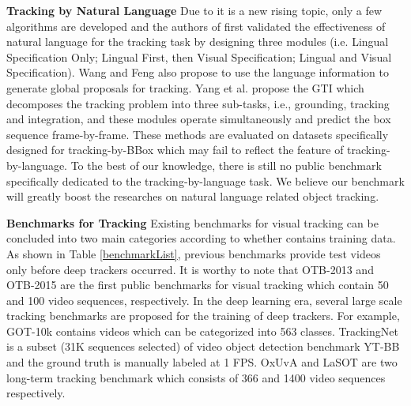 \documentclass[final]{cvpr}
\begin{document}
\textbf{Tracking by Natural Language } 
Due to it is a new rising topic, only a few algorithms are developed and the authors of \cite{li2017tracking} first validated the effectiveness of natural language for the tracking task by designing three modules (i.e. Lingual Specification Only; Lingual First, then Visual Specification; Lingual and Visual Specification). Wang \cite{wang2018describe} and Feng \cite{feng2019robust} also propose to use the language information to generate global proposals for tracking. Yang et al. propose the GTI \cite{yang2019grounding} which decomposes the tracking problem into three sub-tasks, i.e., grounding, tracking and integration, and these modules operate simultaneously and predict the box sequence frame-by-frame. These methods are evaluated on datasets specifically designed for tracking-by-BBox which may fail to reflect the feature of tracking-by-language. To the best of our knowledge, there is still no public benchmark specifically dedicated to the tracking-by-language task. We believe our benchmark will greatly boost the researches on natural language related object tracking. 



\textbf{Benchmarks for Tracking }
Existing benchmarks for visual tracking can be concluded into two main categories according to whether contains training data. As shown in Table \ref{benchmarkList}, previous benchmarks \cite{Liang2015Encoding, Wu2013Online, wu2015object, VOT_TPAMI, nus_pro, li2017visualuav, li2017visualuav, kiani2017Nfs} provide test videos only before deep trackers occurred. It is worthy to note that OTB-2013 \cite{Wu2013Online} and OTB-2015 \cite{wu2015object} are the first public benchmarks for visual tracking which contain 50 and 100 video sequences, respectively. In the deep learning era, several large scale tracking benchmarks are proposed for the training of deep trackers. For example, GOT-10k \cite{huang2019got10k} contains  videos which can be categorized into 563 classes. TrackingNet \cite{muller2018trackingnet} is a subset (31K sequences selected) of video object detection benchmark YT-BB \cite{real2017YTBB} and the ground truth is manually labeled at 1 FPS. OxUvA \cite{valmadre2018longOxUVA} and LaSOT \cite{fan2019lasot} are two long-term tracking benchmark which consists of 366 and 1400 video sequences respectively. 
\end{document}
